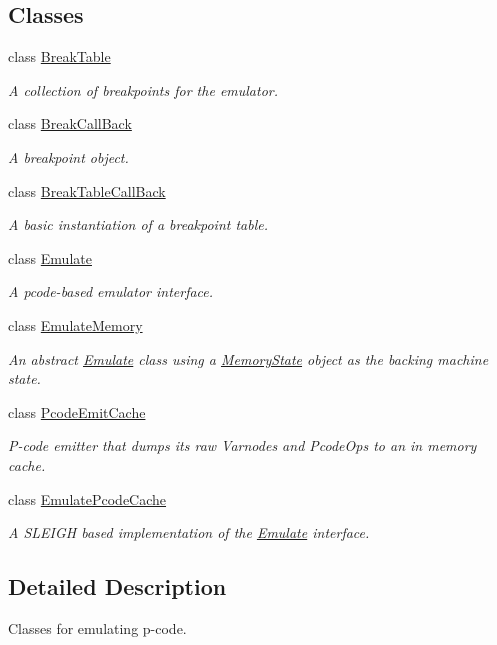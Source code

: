 \subsection*{Classes}
\begin{DoxyCompactItemize}
\item 
class \mbox{\hyperlink{class_break_table}{Break\+Table}}
\begin{DoxyCompactList}\small\item\em A collection of breakpoints for the emulator. \end{DoxyCompactList}\item 
class \mbox{\hyperlink{class_break_call_back}{Break\+Call\+Back}}
\begin{DoxyCompactList}\small\item\em A breakpoint object. \end{DoxyCompactList}\item 
class \mbox{\hyperlink{class_break_table_call_back}{Break\+Table\+Call\+Back}}
\begin{DoxyCompactList}\small\item\em A basic instantiation of a breakpoint table. \end{DoxyCompactList}\item 
class \mbox{\hyperlink{class_emulate}{Emulate}}
\begin{DoxyCompactList}\small\item\em A pcode-\/based emulator interface. \end{DoxyCompactList}\item 
class \mbox{\hyperlink{class_emulate_memory}{Emulate\+Memory}}
\begin{DoxyCompactList}\small\item\em An abstract \mbox{\hyperlink{class_emulate}{Emulate}} class using a \mbox{\hyperlink{class_memory_state}{Memory\+State}} object as the backing machine state. \end{DoxyCompactList}\item 
class \mbox{\hyperlink{class_pcode_emit_cache}{Pcode\+Emit\+Cache}}
\begin{DoxyCompactList}\small\item\em P-\/code emitter that dumps its raw Varnodes and Pcode\+Ops to an in memory cache. \end{DoxyCompactList}\item 
class \mbox{\hyperlink{class_emulate_pcode_cache}{Emulate\+Pcode\+Cache}}
\begin{DoxyCompactList}\small\item\em A S\+L\+E\+I\+GH based implementation of the \mbox{\hyperlink{class_emulate}{Emulate}} interface. \end{DoxyCompactList}\end{DoxyCompactItemize}


\subsection{Detailed Description}
Classes for emulating p-\/code. 

